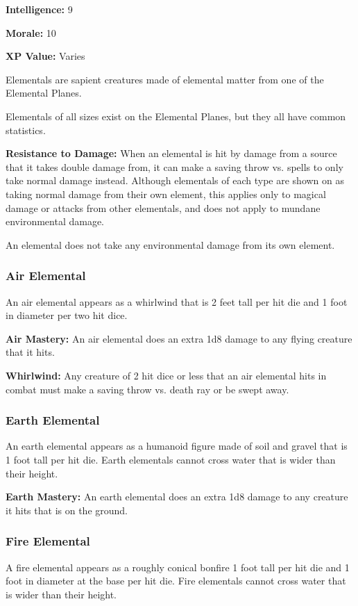 \begin{multicols*}{2}
{{\textbf{Intelligence:} 9

\textbf{Morale:} 10

\textbf{XP Value:} Varies}}

Elementals are sapient creatures made of elemental matter from one of the Elemental Planes.

Elementals of all sizes exist on the Elemental Planes, but they all have common statistics.

\textbf{Resistance to Damage:} When an elemental is hit by damage from a source that it takes double damage from, it can make a saving throw vs. spells to only take normal damage instead. Although elementals of each type are shown on  as taking normal damage from their own element, this applies only to magical damage or attacks from other elementals, and does not apply to mundane environmental damage.

An elemental does not take any environmental damage from its own element.

\subsubsection{Air Elemental}\label{sec:Air Elemental}
An air elemental appears as a whirlwind that is 2 feet tall per hit die and 1 foot in diameter per two hit dice.

\textbf{Air Mastery:} An air elemental does an extra 1d8 damage to any flying creature that it hits.

\textbf{Whirlwind:} Any creature of 2 hit dice or less that an air elemental hits in combat must make a saving throw vs. death ray or be swept away.

\subsubsection{Earth Elemental}
An earth elemental appears as a humanoid figure made of soil and gravel that is 1 foot tall per hit die. Earth elementals cannot cross water that is wider than their height.

\textbf{Earth Mastery:} An earth elemental does an extra 1d8 damage to any creature it hits that is on the ground.

\subsubsection{Fire Elemental}
A fire elemental appears as a roughly conical bonfire 1 foot tall per hit die and 1 foot in diameter at the base per hit die. Fire elementals cannot cross water that is wider than their height.


\end{multicols*}
